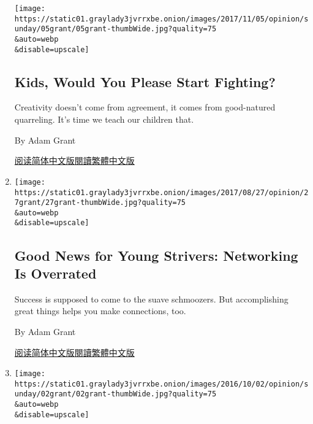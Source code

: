 \begin{enumerate}
  \texttt{[image: https://static01.graylady3jvrrxbe.onion/images/2017/11/05/opinion/sunday/05grant/05grant-thumbWide.jpg?quality=75\\\&auto=webp\\\&disable=upscale]}

  \hypertarget{kids-would-you-please-start-fighting}{%
  \subsection{Kids, Would You Please Start
  Fighting?}\label{kids-would-you-please-start-fighting}}

  Creativity doesn't come from agreement, it comes from good-natured
  quarreling. It's time we teach our children that.

  By Adam Grant

  \href{https://cn.nytimes3xbfgragh.onion/opinion/20171115/kids-would-you-please-start-fighting/}{阅读简体中文版}\href{https://cn.nytimes3xbfgragh.onion/opinion/20171115/kids-would-you-please-start-fighting/zh-hant/}{閱讀繁體中文版}
\item
  \href{/2017/08/24/opinion/sunday/networking-connections-business.html}{}

  \texttt{[image: https://static01.graylady3jvrrxbe.onion/images/2017/08/27/opinion/27grant/27grant-thumbWide.jpg?quality=75\\\&auto=webp\\\&disable=upscale]}

  \hypertarget{good-news-for-young-strivers-networking-is-overrated}{%
  \subsection{Good News for Young Strivers: Networking Is
  Overrated}\label{good-news-for-young-strivers-networking-is-overrated}}

  Success is supposed to come to the suave schmoozers. But accomplishing
  great things helps you make connections, too.

  By Adam Grant

  \href{https://cn.nytimes3xbfgragh.onion/opinion/20170825/networking-connections-business/}{阅读简体中文版}\href{https://cn.nytimes3xbfgragh.onion/opinion/20170825/networking-connections-business/zh-hant/}{閱讀繁體中文版}
\item
  \href{/2016/10/02/opinion/sunday/dont-like-the-candidates-vote-anyway.html}{}

  \texttt{[image: https://static01.graylady3jvrrxbe.onion/images/2016/10/02/opinion/sunday/02grant/02grant-thumbWide.jpg?quality=75\\\&auto=webp\\\&disable=upscale]}

  \hypertarget{dont-like-the-candidates-vote-anyway}{%
}
\end{enumerate}
